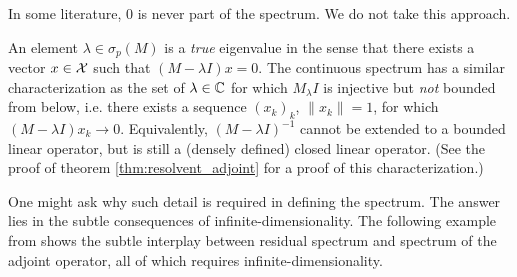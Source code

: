 \begin{remark}
    In some literature, $0$ is never part of the spectrum. We do not take this approach. 
\end{remark}

An element $\lambda \in \sigma_p (M)$ is a \emph{true} eigenvalue in the sense that there 
exists a vector $x \in \mathcal{X}$ such that $(M - \lambda I) x = 0$. The continuous spectrum 
has a similar characterization as the set of $\lambda \in \mathbb{C}$ for which $M _ \lambda I$ 
is injective but \emph{not} bounded from below, i.e. there exists a sequence $(x_k)_k$, 
$\| x_k \| = 1$, for which $(M - \lambda I) x_k \to 0$. Equivalently, 
$(M - \lambda I)^{-1}$ cannot be extended to a bounded linear operator, but is still a 
(densely defined) closed linear operator. (See the proof of theorem 
\ref{thm:resolvent_adjoint} for a proof of this characterization.)

One might ask why such detail is required in defining the spectrum. The answer lies in 
the subtle consequences of infinite-dimensionality. The following example from 
\cite{spectraexample} shows the subtle interplay between residual spectrum and spectrum 
of the adjoint operator, all of which requires infinite-dimensionality. 

